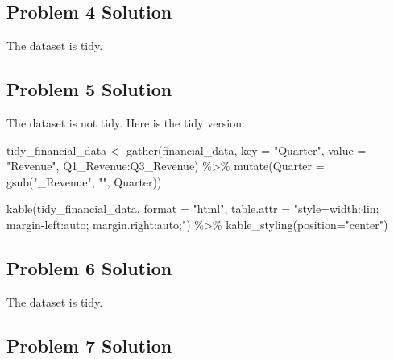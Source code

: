 \documentclass[
  letterpaper,
  DIV=11,
  numbers=noendperiod]{scrreprt}
\newenvironment{Shaded}{\begin{snugshade}}{\end{snugshade}}
\newcommand{\AttributeTok}[1]{\textcolor[rgb]{0.40,0.45,0.13}{#1}}
\newcommand{\FunctionTok}[1]{\textcolor[rgb]{0.28,0.35,0.67}{#1}}
\newcommand{\NormalTok}[1]{\textcolor[rgb]{0.00,0.23,0.31}{#1}}
\newcommand{\OtherTok}[1]{\textcolor[rgb]{0.00,0.23,0.31}{#1}}
\newcommand{\SpecialCharTok}[1]{\textcolor[rgb]{0.37,0.37,0.37}{#1}}
\newcommand{\StringTok}[1]{\textcolor[rgb]{0.13,0.47,0.30}{#1}}
\begin{document}
\subsection*{Problem 4 Solution}\label{problem-4-solution}

The dataset is tidy.

\subsection*{Problem 5 Solution}\label{problem-5-solution}

The dataset is not tidy. Here is the tidy version:

\begin{Shaded}
\begin{Highlighting}[]
\NormalTok{tidy\_financial\_data }\OtherTok{\textless{}{-}} \FunctionTok{gather}\NormalTok{(financial\_data, }\AttributeTok{key =} \StringTok{"Quarter"}\NormalTok{, }\AttributeTok{value =} \StringTok{"Revenue"}\NormalTok{, Q1\_Revenue}\SpecialCharTok{:}\NormalTok{Q3\_Revenue) }\SpecialCharTok{\%\textgreater{}\%}
  \FunctionTok{mutate}\NormalTok{(}\AttributeTok{Quarter =} \FunctionTok{gsub}\NormalTok{(}\StringTok{"\_Revenue"}\NormalTok{, }\StringTok{""}\NormalTok{, Quarter))}

\FunctionTok{kable}\NormalTok{(tidy\_financial\_data, }\AttributeTok{format =} \StringTok{"html"}\NormalTok{, }\AttributeTok{table.attr =} \StringTok{"style=\textquotesingle{}width:4in; margin{-}left:auto; margin.right:auto;\textquotesingle{}"}\NormalTok{)  }\SpecialCharTok{\%\textgreater{}\%}
  \FunctionTok{kable\_styling}\NormalTok{(}\AttributeTok{position=}\StringTok{"center"}\NormalTok{)}
\end{Highlighting}
\end{Shaded}

\subsection*{Problem 6 Solution}\label{problem-6-solution}

The dataset is tidy.

\subsection*{Problem 7 Solution}\label{problem-7-solution}
\end{document}
